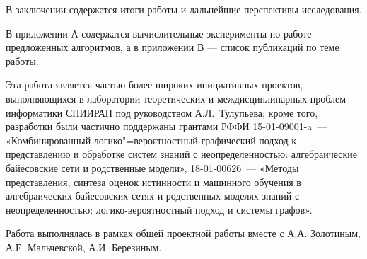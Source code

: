 В заключении содержатся итоги работы и дальнейшие перспективы исследования.

В приложении А содержатся вычислительные эксперименты по работе предложенных алгоритмов, а в приложении В --- список публикаций по теме работы.

\small{
Эта работа является частью более широких инициативных проектов, выполняющихся в лаборатории теоретических и междисциплинарных проблем информатики СПИИРАН под руководством А.Л.~Тулупьева; кроме того, разработки были частично поддержаны грантами РФФИ 15-01-09001-a~--- «Комбинированный логико"=вероятностный графический подход к представлению и обработке систем знаний с неопределенностью: алгебраические байесовские сети и родственные модели», 18-01-00626~--- «Методы представления, синтеза оценок истинности и машинного обучения в алгебраических байесовских сетях и родственных моделях знаний с неопределенностью: логико-вероятностный подход и системы графов».}

\normalsize
Работа выполнялась в рамках общей проектной работы вместе с А.А. Золотиным, А.Е. Мальчевской, А.И. Березиным.